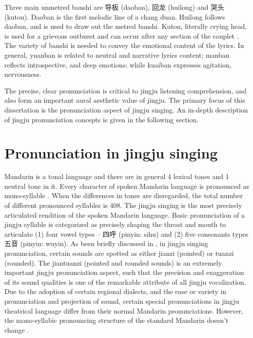 Three main unmetred banshi are 导板 (daoban), 回龙 (huilong) and 哭头 (kutou). Daoban is the first melodic line of a chang duan. Huilong follows daoban, and is used to draw out the metred banshi. Kutou, literally crying head, is used for a grievous outburst and can occur after any section of the couplet \cite{Repetto2018}. The variety of banshi is needed to convey the emotional content of the lyrics. In general, yuanban is related to neutral and narrative lyrics content; manban reflects introspective, and deep emotions; while kuaiban expresses agitation, nervousness.

The precise, clear pronunciation is critical to jingju listening comprehension, and also form an important aural aesthetic value of jingju. The primary focus of this dissertation is the pronunciation aspect of jingju singing. An in-depth description of jingju pronunciation concepts is given in the following section.

\section{Pronunciation in jingju singing}

Mandarin is a tonal language and there are in general 4 lexical tones and 1 neutral tone in it. Every character of spoken Mandarin language is pronounced as mono-syllable \cite{lin_new_1993}. When the differences in tones are disregarded, the total number of different pronounced syllables is 408. The jingju singing is the most precisely articulated rendition of the spoken Mandarin language. Basic pronunciation of a jingju syllable is categorized as precisely shaping the throat and mouth to articulate (1) four vowel types -- 四呼 (pinyin: sihu) and (2) five consonants types 五音 (pinyin: wuyin). As been briefly discussed in , in jingju singing pronunciation, certain sounds are spotted as either \gls{jianzi} (pointed) or \gls{tuanzi} (rounded). The \gls{jiantuanzi} (pointed and rounded sounds) is an extremely important jingju pronunciation aspect, such that the precision and exaggeration of its sound qualities is one of the remarkable attribute of all jingju vocalization. Due to the adoption of certain regional dialects, and the ease or variety in pronunciation and projection of sound, certain special pronunciations in jingju theatrical language differ from their normal Mandarin pronunciations. However, the mono-syllabic pronouncing structure of the standard Mandarin doesn't change \cite{Wichmann1991a}. 

